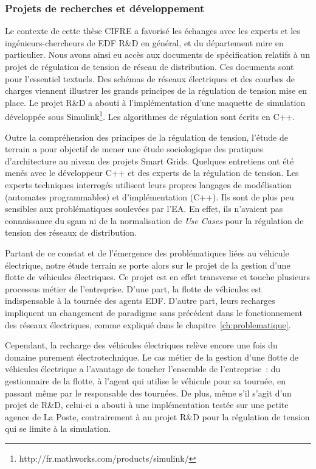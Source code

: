\subsubsection{Projets de recherches et développement}
\label{motivations_cas_metier}

Le contexte de cette thèse CIFRE a favorisé les échanges avec les experts et les
ingénieurs-chercheurs de EDF R\&D en général, et du département \gls{mire} en
particulier. Nous avons ainsi eu accès aux documents de spécification relatifs à
un projet de régulation de tension de réseau de distribution. Ces documents sont
pour l'essentiel textuels. Des schémas de réseaux électriques et des courbes de
charges viennent illustrer les grands principes de la régulation de tension
mise en place. Le projet R\&D a abouti à l'implémentation d'une maquette de
simulation développée sous
Simulink\footnote{http://fr.mathworks.com/products/simulink/}. Les algorithmes
de régulation sont écrits en C++.

Outre la compréhension des principes de la régulation de tension, l'étude de
terrain a pour objectif de mener une étude sociologique des pratiques
d'architecture au niveau des projets Smart Grids. Quelques entretiens ont été
menés avec le développeur C++ et des experts de la régulation de tension. Les
experts techniques interrogés utilisent leurs propres langages de modélisation
(automates programmables) et d'implémentation (C++). Ils sont de plus peu
sensibles aux problématiques soulevées par l'EA. En effet, ils n'avaient pas
connaissance du \gls{sgam} ni de la normalisation de \textit{Use Cases} pour la
régulation de tension des réseaux de distribution.

Partant de ce constat et de l'émergence des problématiques liées au véhicule
électrique, notre étude terrain se porte alors sur le projet de la gestion
d'une flotte de véhicules électriques. Ce projet est en effet transverse et touche plusieurs processus métier de
l'entreprise. D'une part, la flotte de véhicules est indispensable à la tournée
des agents EDF. D'autre part, leurs recharges impliquent un changement de
paradigme sans précédent dans le fonctionnement des réseaux électriques, comme
expliqué dans le chapitre~\ref{ch:problematique}.

Cependant, la recharge des véhicules électriques relève encore une fois du
domaine purement électrotechnique. Le cas métier de la gestion d'une flotte de
véhicules électrique a l'avantage de toucher l'ensemble de l'entreprise~: du
gestionnaire de la flotte, à l'agent qui utilise le véhicule pour sa tournée,
en passant même par le responsable des tournées. De plus, même s'il s'agit d'un
projet de R\&D, celui-ci a abouti à une implémentation testée sur une petite
agence de La Poste, contrairement à au projet R\&D pour la régulation de
tension qui se limite à la simulation.

